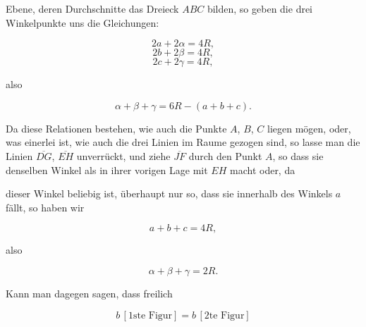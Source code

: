 %
Ebene, deren Durchschnitte das Dreieck $ABC$ bilden, so geben die drei Winkelpunkte uns die Gleichungen:

\[ 2a + 2\alpha = 4R, \]
\[ 2b + 2\beta = 4R, \]
\[ 2c + 2\gamma = 4R, \]

\noindent also

\[ \alpha + \beta + \gamma = 6R - (a+b+c). \]

Da diese Relationen bestehen, wie auch die Punkte $A$, $B$, $C$ liegen mögen, oder, was einerlei ist, wie auch die drei Linien im Raume gezogen sind, so lasse man die Linien $\overline{DG}$, $\overline{EH}$ unverrückt, und ziehe $\overline{JF}$ durch den Punkt $A$, so dass sie denselben Winkel als in ihrer vorigen Lage mit $EH$ macht oder, da

\begin{center}

\par [Fig. 2.]
\end{center}

\noindent dieser Winkel beliebig ist, überhaupt nur so, dass sie innerhalb des Winkels $a$ fällt, so haben wir

\[ a + b + c = 4R, \]

\noindent also

\[ \alpha + \beta + \gamma = 2R. \]

Kann man dagegen sagen, dass freilich

\[ b\,[\text{1ste Figur}] = b\,[\text{2te Figur}] \]
